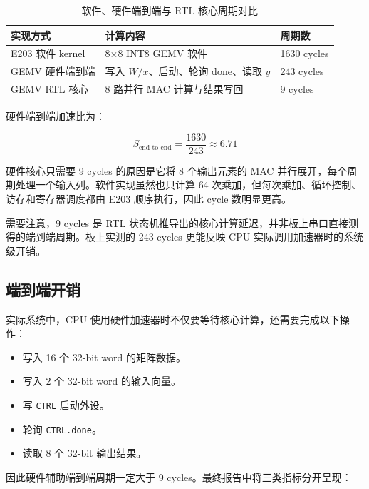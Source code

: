 \documentclass[12pt, a4paper]{article}
\begin{document}
\begin{table}[H]
    \centering
    \caption{软件、硬件端到端与 RTL 核心周期对比}
    \label{tab:perf-core}
    \begin{tabular}{p{4.0cm}p{5.7cm}p{3.2cm}}
        \toprule
        \textbf{实现方式} & \textbf{计算内容} & \textbf{周期数} \\
        \midrule
        E203 软件 kernel & 8$\times$8 INT8 GEMV 软件 & 1630 cycles \\
        GEMV 硬件端到端 & 写入 $W/x$、启动、轮询 done、读取 $y$ & 243 cycles \\
        GEMV RTL 核心 & 8 路并行 MAC 计算与结果写回 & 9 cycles \\
        \bottomrule
    \end{tabular}
\end{table}

硬件端到端加速比为：

\begin{equation}
    S_{\text{end-to-end}} = \frac{1630}{243} \approx 6.71
\end{equation}

硬件核心只需要 9 cycles 的原因是它将 8 个输出元素的 MAC 并行展开，每个周期处理一个输入列。软件实现虽然也只计算 64 次乘加，但每次乘加、循环控制、访存和寄存器调度都由 E203 顺序执行，因此 cycle 数明显更高。

需要注意，9 cycles 是 RTL 状态机推导出的核心计算延迟，并非板上串口直接测得的端到端周期。板上实测的 243 cycles 更能反映 CPU 实际调用加速器时的系统级开销。

\subsection{端到端开销}

实际系统中，CPU 使用硬件加速器时不仅要等待核心计算，还需要完成以下操作：

\begin{itemize}
    \item 写入 16 个 32-bit word 的矩阵数据。
    \item 写入 2 个 32-bit word 的输入向量。
    \item 写 \texttt{CTRL} 启动外设。
    \item 轮询 \texttt{CTRL.done}。
    \item 读取 8 个 32-bit 输出结果。
\end{itemize}

因此硬件辅助端到端周期一定大于 9 cycles。最终报告中将三类指标分开呈现：
\end{document}
